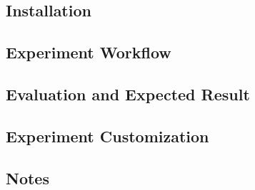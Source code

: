 \subsection{Installation}

\subsection{Experiment Workflow}

\subsection{Evaluation and Expected Result}

\subsection{Experiment Customization}

\subsection{Notes}
